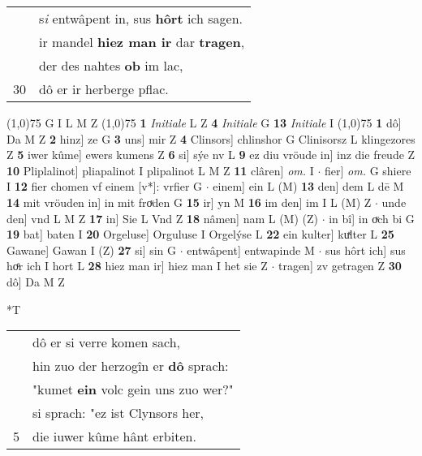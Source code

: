 \documentclass[8pt,a4paper,notitlepage]{article}
\begin{document}
\begin{table}[ht]
\begin{minipage}[t]{0.5\linewidth}
\begin{tabular}{rl}
 & s\textit{i} entwâpent in, sus \textbf{hôrt} ich sagen.\\ 
 & ir mandel \textbf{hiez man ir} dar \textbf{tragen},\\ 
 & der des nahtes \textbf{ob} im lac,\\ 
30 & dô er ir herberge pflac.\\ 
\end{tabular}
\scriptsize
\line(1,0){75} \newline
G I L M Z \newline
\line(1,0){75} \newline
\textbf{1} \textit{Initiale} L Z  \textbf{4} \textit{Initiale} G  \textbf{13} \textit{Initiale} I  \newline
\line(1,0){75} \newline
\textbf{1} dô] Da M Z \textbf{2} hinz] ze G \textbf{3} uns] mir Z \textbf{4} Clinsors] chlinshor G Clinisorsz L klingezores Z \textbf{5} iwer kûme] ewers kumens Z \textbf{6} si] sýe nv L \textbf{9} ez diu vröude in] inz die freude Z \textbf{10} Pliplalinot] pliapalinot I plipalinot L M Z \textbf{11} clâren] \textit{om.} I  $\cdot$ fier] \textit{om.} G shiere I \textbf{12} fier chomen vf einem [v*]: vrfier G  $\cdot$ einem] ein L (M) \textbf{13} den] dem L dē M \textbf{14} mit vröuden in] in mit froͮden G \textbf{15} ir] yn M \textbf{16} im den] im I L (M) Z  $\cdot$ unde den] vnd L M Z \textbf{17} in] Sie L Vnd Z \textbf{18} nâmen] nam L (M) (Z)  $\cdot$ in bî] in oͮch  bi G \textbf{19} bat] baten I \textbf{20} Orgeluse] Orguluse I Orgelýse L \textbf{22} ein kulter] kuͯlter L \textbf{25} Gawane] Gawan I (Z) \textbf{27} si] sin G  $\cdot$ entwâpent] entwapinde M  $\cdot$ sus hôrt ich] sus hoͤr ich I hort L \textbf{28} hiez man ir] hiez man I het sie Z  $\cdot$ tragen] zv getragen Z \textbf{30} dô] Da M Z \newline
\end{minipage}
\hspace{0.5cm}
\begin{minipage}[t]{0.5\linewidth}
\small
\begin{center}*T
\end{center}
\begin{tabular}{rl}
 & dô er si verre komen sach,\\ 
 & hin zuo der herzogîn er \textbf{dô} sprach:\\ 
 & "kumet \textbf{ein} volc gein uns zuo wer?"\\ 
 & si sprach: "ez ist Clynsors her,\\ 
5 & die iuwer kûme hânt erbiten.\\ 

\end{tabular}
\end{minipage}
\end{table}
\end{document}
